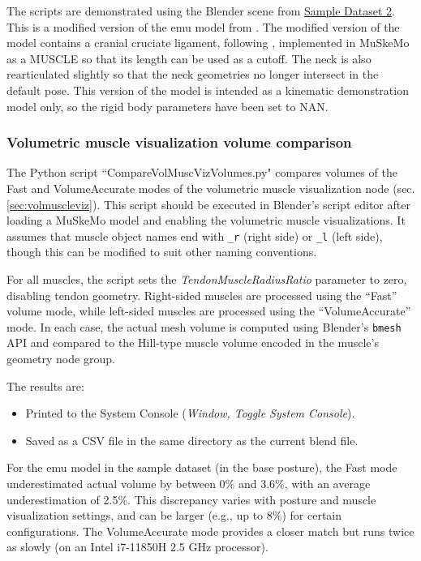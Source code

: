 \documentclass{article}
\begin{document}
The scripts are demonstrated using the Blender scene from \href{https://github.com/PashavanBijlert/MuSkeMo/releases/tag/v0.x-sampledataset2}{Sample Dataset 2}. This is a modified version of the emu model from \cite{vanbijlertMusclecontrolledPhysicsSimulations2024}. The modified version of the model contains a cranial cruciate ligament, following \cite{fussCruciateLigamentsAvian1992}, implemented in MuSkeMo as a MUSCLE so that its length can be used as a cutoff. The neck is also rearticulated slightly so that the neck geometries no longer intersect in the default pose. This version of the model is intended as a kinematic demonstration model only, so the rigid body parameters have been set to NAN.

\subsubsection{Volumetric muscle visualization volume comparison}
\label{sec:volcomparisonscript}

The Python script ``CompareVolMuscVizVolumes.py" compares volumes of the Fast and VolumeAccurate modes of the volumetric muscle visualization node (sec. \ref{sec:volmuscleviz}). This script should be executed in Blender's script editor after loading a MuSkeMo model and enabling the volumetric muscle visualizations. It assumes that muscle object names end with \texttt{\_r} (right side) or \texttt{\_l} (left side), though this can be modified to suit other naming conventions.

For all muscles, the script sets the \emph{TendonMuscleRadiusRatio} parameter to zero, disabling tendon geometry. Right-sided muscles are processed using the ``Fast'' volume mode, while left-sided muscles are processed using the ``VolumeAccurate'' mode. In each case, the actual mesh volume is computed using Blender's \texttt{bmesh} API and compared to the Hill-type muscle volume encoded in the muscle's geometry node group.

The results are:
\begin{itemize}
    \item Printed to the System Console (\emph{Window, Toggle System Console}).
    \item Saved as a CSV file in the same directory as the current blend file.
\end{itemize}

For the emu model in the sample dataset (in the base posture), the Fast mode underestimated actual volume by between 0\% and 3.6\%, with an average underestimation of 2.5\%. This discrepancy varies with posture and muscle visualization settings, and can be larger (e.g., up to 8\%) for certain configurations. The VolumeAccurate mode provides a closer match but runs twice as slowly (on an Intel i7-11850H 2.5 GHz processor). 
\end{document}
